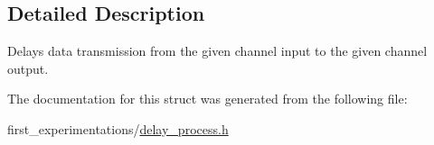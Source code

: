 \subsection{Detailed Description}
Delays data transmission from the given channel input to the given channel output. 

The documentation for this struct was generated from the following file\-:\begin{DoxyCompactItemize}
\item 
first\-\_\-experimentations/\hyperlink{delay__process_8h}{delay\-\_\-process.\-h}\end{DoxyCompactItemize}
